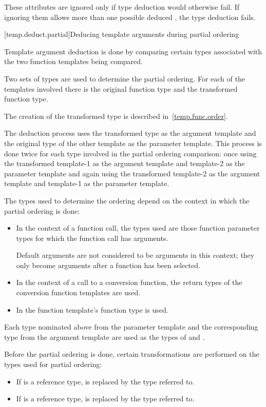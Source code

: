 \pnum
These attributes are ignored only if type deduction would
otherwise fail.
If ignoring them allows more than one possible deduced
,
the type deduction fails.

[temp.deduct.partial]{Deducing template arguments during partial ordering}

\pnum
Template argument deduction is done by comparing certain types associated with
the two function templates being compared.

\pnum
Two sets of types are used to determine the partial ordering.  For each of
the templates involved there is the original function type and the
transformed function type.
\begin{note}
The creation of the transformed type is described in~\ref{temp.func.order}.
\end{note}
The deduction process uses the
transformed type as the argument template and the original type of the
other template as the parameter template.  This process is done twice
for each type involved in the partial ordering comparison: once using
the transformed template-1 as the argument template and template-2 as
the parameter template and again using the transformed template-2 as
the argument template and template-1 as the parameter template.

\pnum
The types used to determine the ordering depend on the context in which
the partial ordering is done:
\begin{itemize}
\item
In the context of a function call, the types used are those function parameter types
for which the function call has arguments.
\begin{footnote}
Default arguments
are not considered to be arguments in this context; they only become arguments
after a function has been selected.
\end{footnote}
\item
In the context of a call to a conversion function, the return types of
the conversion function templates are used.
\item
In  the function template's function
type is used.
\end{itemize}

\pnum
Each type nominated above from the parameter template and the corresponding type from the
argument template are used as the types of
and
.

\pnum
Before the partial ordering is done, certain transformations are performed
on the types used for partial ordering:
\begin{itemize}
\item
If
is a reference type,
is replaced by the type referred to.
\item
If
is a reference type,
is replaced by the type referred to.
\end{itemize}

